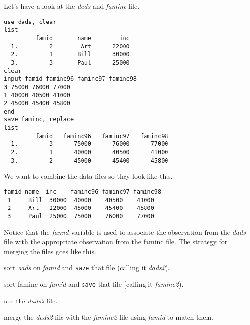 Let's have a look at the \textit{dads} and \textit{faminc} file.

\begin{lstlisting}
use dads, clear
list
         famid       name        inc
  1.         2        Art      22000
  2.         1       Bill      30000
  3.         3       Paul      25000
clear
input famid faminc96 faminc97 faminc98
3 75000 76000 77000
1 40000 40500 41000
2 45000 45400 45800
end
save faminc, replace
list
         famid   faminc96   faminc97   faminc98
  1.         3      75000      76000      77000
  2.         1      40000      40500      41000
  3.         2      45000      45400      45800
\end{lstlisting}

We want to combine the data files so they look like this.

\begin{lstlisting}
famid name  inc    faminc96 faminc97 faminc98
 1     Bill  30000  40000    40500    41000
 2     Art   22000  45000    45400    45800
 3     Paul  25000  75000    76000    77000
\end{lstlisting}

Notice that the \textit{famid} variable is used to associate the observation from the \textit{dads} file with the appropriate observation from the faminc file.  The strategy for merging the files goes like this.
\begin{compactenum}
\item sort \textit{dads} on \textit{famid} and \lstinline{save} that file (calling it \textit{dads2}).
\item sort faminc on \textit{famid} and \lstinline{save} that file (calling it \textit{faminc2}).
\item use the \textit{dads2} file.
\item merge the \textit{dads2} file with the \textit{faminc2} file using \textit{famid} to match them.
\end{compactenum}

